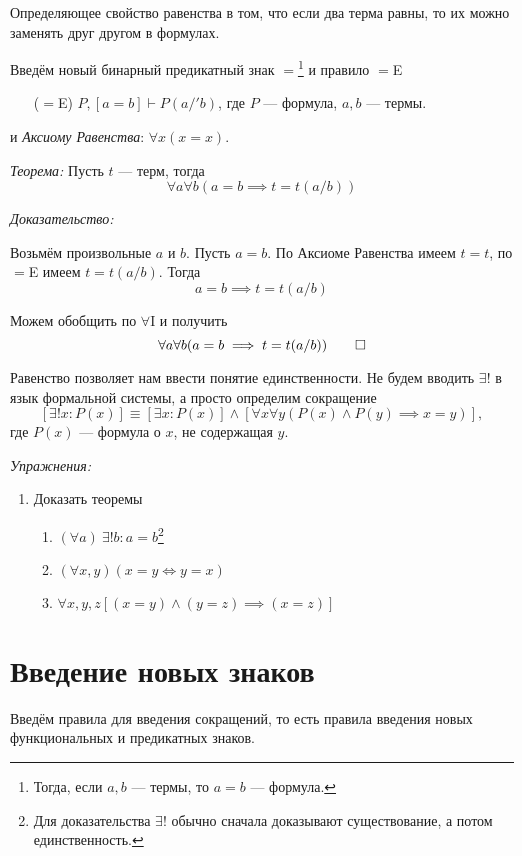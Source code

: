 Определяющее свойство равенства в том, что если два терма равны, то их можно
заменять друг другом в формулах.

Введём новый бинарный предикатный знак $=$\footnote{
	Тогда, если $a,b$	 --- термы, то $a=b$ --- формула.}
и правило $=$E
\begin{enumerate}
	\item[($=$E)]{}$P,[a=b]\vdash P(a/'b)$,
	где $P$ --- формула, $a,b$ --- термы.
\end{enumerate}
и {\it Аксиому Равенства}: $\forall x(x=x)$.

\vspace{1em}
{\it Теорема:} Пусть $t$ --- терм, тогда
\[
	\forall a\forall b(a=b\implies t=t(a/b))
\]

{\it Доказательство:}

Возьмём произвольные $a$ и $b$. Пусть $a=b$.
По Аксиоме Равенства имеем $t=t$, по $=$E имеем $t=t(a/b)$.
Тогда
\[
	a=b\implies t=t(a/b)
\]

Можем обобщить по $\forall$I и получить
\[
	\forall a\forall b(a=b\implies t=t(a/b))
	\qed
\]

Равенство позволяет нам ввести понятие единственности.
Не будем вводить $\exists!$ в язык формальной системы, а просто определим сокращение
\[
	[\exists! x:P(x)]\equiv[\exists x:P(x)]\land
	[\forall x\forall y(P(x)\land P(y)\implies x=y)],
\]
где $P(x)$ --- формула о $x$, не содержащая $y$.

\vspace{1em}
{\it Упражнения:}
\begin{enumerate}
	\item{}Доказать теоремы
	\begin{enumerate}
		\item{}$(\forall a)~\exists! b:a=b$\footnote{
			Для доказательства $\exists!$ обычно сначала
			доказывают существование, а потом единственность.
		}
		\item{}$(\forall x,y)(x=y\iff y=x)$
		\item{}$\forall x,y,z[(x=y)\land (y=z)\implies (x=z)]$
	\end{enumerate}
\end{enumerate}

\section{Введение новых знаков}

Введём правила для введения сокращений, то есть правила введения новых функциональных
и предикатных знаков.

